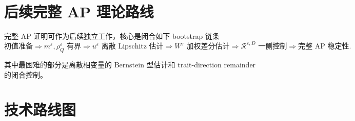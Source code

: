 \documentclass[11pt,a4paper]{ctexart}
\begin{document}
\section{后续完整 AP 理论路线}

完整 AP 证明可作为后续独立工作，核心是闭合如下 bootstrap 链条
\[
\text{初值准备}
\Longrightarrow
m^\varepsilon,\rho_Q^\varepsilon \text{ 有界}
\Longrightarrow
u^\varepsilon \text{ 离散 Lipschitz 估计}
\Longrightarrow
W^\varepsilon \text{ 加权差分估计}
\Longrightarrow
\mathcal R^{\varepsilon,D} \text{ 一侧控制}
\Longrightarrow
\text{完整 AP 稳定性}.
\]

其中最困难的部分是离散相变量的 Bernstein 型估计和 trait-direction remainder 的闭合控制。

\newpage

\section{技术路线图}
\end{document}
